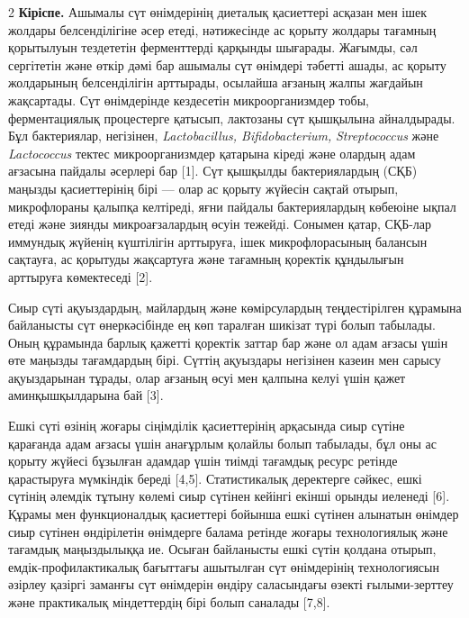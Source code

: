 \begin{multicols}{2}
{\bfseries Кіріспе.} Ашымалы сүт өнімдерінің диеталық қасиеттері асқазан
мен ішек жолдары белсенділігіне әсер етеді, нәтижесінде ас қорыту
жолдары тағамның қорытылуын тездететін ферменттерді қарқынды шығарады.
Жағымды, сәл сергітетін және өткір дәмі бар ашымалы сүт өнімдері тәбетті
ашады, ас қорыту жолдарының белсенділігін арттырады, осылайша ағзаның
жалпы жағдайын жақсартады. Сүт өнімдерінде кездесетін микроорганизмдер
тобы, ферментациялық процестерге қатысып, лактозаны сүт қышқылына
айналдырады. Бұл бактериялар, негізінен, \emph{Lactobacillus,
Bifidobacterium,} \emph{Streptococcus} және \emph{Lactococcus} тектес
микроорганизмдер қатарына кіреді және олардың адам ағзасына пайдалы
әсерлері бар {[}1{]}. Сүт қышқылды бактериялардың (СҚБ) маңызды
қасиеттерінің бірі --- олар ас қорыту жүйесін сақтай отырып,
микрофлораны қалыпқа келтіреді, яғни пайдалы бактериялардың көбеюіне
ықпал етеді және зиянды микроағзалардың өсуін тежейді. Сонымен қатар,
СҚБ-лар иммундық жүйенің күштілігін арттыруға, ішек микрофлорасының
балансын сақтауға, ас қорытуды жақсартуға және тағамның қоректік
құндылығын арттыруға көмектеседі {[}2{]}.

Сиыр сүті ақуыздардың, майлардың және көмірсулардың теңдестірілген
құрамына байланысты сүт өнеркәсібінде ең көп таралған шикізат түрі болып
табылады. Оның құрамында барлық қажетті қоректік заттар бар және ол адам
ағзасы үшін өте маңызды тағамдардың бірі. Сүттің ақуыздары негізінен
казеин мен сарысу ақуыздарынан тұрады, олар ағзаның өсуі мен қалпына
келуі үшін қажет аминқышқылдарына бай {[}3{]}.

Ешкі сүті өзінің жоғары сіңімділік қасиеттерінің арқасында сиыр сүтіне
қарағанда адам ағзасы үшін анағұрлым қолайлы болып табылады, бұл оны ас
қорыту жүйесі бұзылған адамдар үшін тиімді тағамдық ресурс ретінде
қарастыруға мүмкіндік береді {[}4,5{]}. Статистикалық деректерге сәйкес,
ешкі сүтінің әлемдік тұтыну көлемі сиыр сүтінен кейінгі екінші орынды
иеленеді {[}6{]}. Құрамы мен функционалдық қасиеттері бойынша ешкі
сүтінен алынатын өнімдер сиыр сүтінен өндірілетін өнімдерге балама
ретінде жоғары технологиялық және тағамдық маңыздылыққа ие. Осыған
байланысты ешкі сүтін қолдана отырып, емдік-профилактикалық бағыттағы
ашытылған сүт өнімдерінің технологиясын әзірлеу қазіргі заманғы сүт
өнімдерін өндіру саласындағы өзекті ғылыми-зерттеу және практикалық
міндеттердің бірі болып саналады {[}7,8{]}.


\end{multicols}
